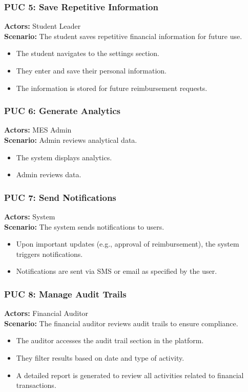 \documentclass[12pt]{article}
\begin{document}
\subsubsection{PUC 5: Save Repetitive Information}
\textbf{Actors:} Student Leader \\
\textbf{Scenario:} The student saves repetitive financial information for future use.
\begin{itemize}
    \item The student navigates to the settings section.
    \item They enter and save their personal information.
    \item The information is stored for future reimbursement requests.
\end{itemize}

\subsubsection{PUC 6: Generate Analytics}
\textbf{Actors:} MES Admin \\
\textbf{Scenario:} Admin reviews analytical data.
\begin{itemize}
    \item The system displays analytics.
    \item Admin reviews data. 
\end{itemize}

\subsubsection{PUC 7: Send Notifications}
\textbf{Actors:} System \\
\textbf{Scenario:} The system sends notifications to users.
\begin{itemize}
    \item Upon important updates (e.g., approval of reimbursement), the system triggers notifications.
    \item Notifications are sent via SMS or email as specified by the user.
\end{itemize}

\subsubsection{PUC 8: Manage Audit Trails}
\textbf{Actors:} Financial Auditor \\
\textbf{Scenario:} The financial auditor reviews audit trails to ensure compliance.
\begin{itemize}
    \item The auditor accesses the audit trail section in the platform.
    \item They filter results based on date and type of activity.
    \item A detailed report is generated to review all activities related to financial transactions.
\end{itemize}
\end{document}
